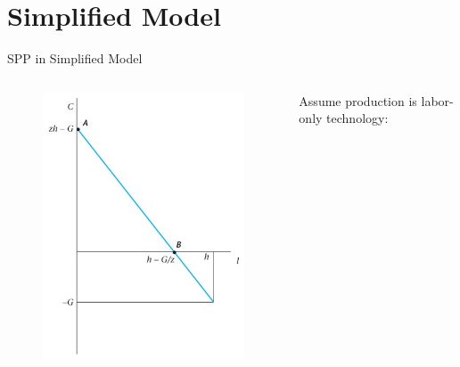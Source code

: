 \documentclass[11pt,aspectratio=43]{beamer}
\theoremstyle{definition}
\begin{document}
\section{Simplified Model}
\label{sec:Simplified_Model}

\begin{frame}{SPP in Simplified Model}
\label{slide:SPP_in_Simplified_Model}
    \begin{columns}
        \begin{column}{0.5\textwidth}
            \begin{figure}
                \includegraphics[width=\textwidth]{./figures/Figure_5_14.jpg}
            \end{figure}
        \end{column}
        \begin{column}{0.5\textwidth}
            Assume production is labor-only technology:


\end{column}
\end{columns}
\end{frame}
\end{document}
